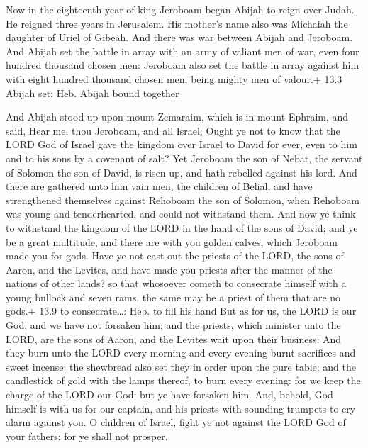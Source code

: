  Now in the eighteenth year of king Jeroboam began Abijah to
reign over Judah.  He reigned three years in Jerusalem. His
mother's name also was Michaiah the daughter of Uriel of Gibeah. And
there was war between Abijah and Jeroboam.  And Abijah set
the battle in array with an army of valiant men of war, even four
hundred thousand chosen men: Jeroboam also set the battle in array
against him with eight hundred thousand chosen men, being mighty men of
valour.+ 13.3 Abijah set: Heb. Abijah bound together

 And Abijah stood up upon mount Zemaraim, which is in
mount Ephraim, and said, Hear me, thou Jeroboam, and all Israel;
 Ought ye not to know that the LORD God of Israel gave the
kingdom over Israel to David for ever, even to him and to his sons by a
covenant of salt?  Yet Jeroboam the son of Nebat, the
servant of Solomon the son of David, is risen up, and hath rebelled
against his lord.  And there are gathered unto him vain men,
the children of Belial, and have strengthened themselves against
Rehoboam the son of Solomon, when Rehoboam was young and tenderhearted,
and could not withstand them.  And now ye think to withstand
the kingdom of the LORD in the hand of the sons of David; and ye be a
great multitude, and there are with you golden calves, which Jeroboam
made you for gods.  Have ye not cast out the priests of the
LORD, the sons of Aaron, and the Levites, and have made you priests
after the manner of the nations of other lands? so that whosoever cometh
to consecrate himself with a young bullock and seven rams, the same may
be a priest of them that are no gods.+ 13.9 to consecrate\ldots: Heb. to
fill his hand  But as for us, the LORD is our God, and we
have not forsaken him; and the priests, which minister unto the LORD,
are the sons of Aaron, and the Levites wait upon their business:
 And they burn unto the LORD every morning and every
evening burnt sacrifices and sweet incense: the shewbread also set they
in order upon the pure table; and the candlestick of gold with the lamps
thereof, to burn every evening: for we keep the charge of the LORD our
God; but ye have forsaken him.  And, behold, God himself is
with us for our captain, and his priests with sounding trumpets to cry
alarm against you. O children of Israel, fight ye not against the LORD
God of your fathers; for ye shall not prosper.

